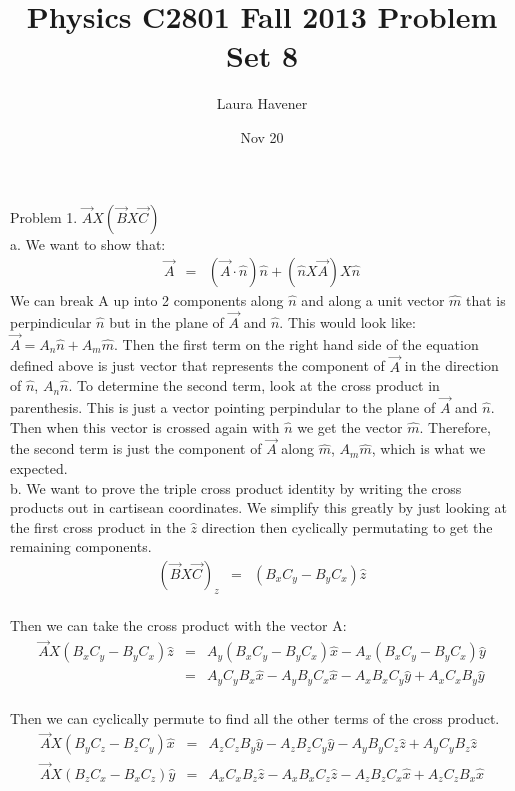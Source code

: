 \documentclass[11pt]{amsart}
\title{Physics C2801 Fall 2013 Problem Set 8}
\author{Laura Havener}
\date{Nov 20} %
\begin{document}
\maketitle

Problem 1. $\vec{A}X(\vec{B}X\vec{C})$ \\ 
a. We want to show that: \\
\begin{eqnarray*}
\vec{A} &=& (\vec{A}\cdot{\hat{n}})\hat{n}+(\hat{n}X\vec{A})X\hat{n} 
\end{eqnarray*} 
We can break A up into 2 components along $\hat{n}$ and along a unit vector $\hat{m}$ that is perpindicular $\hat{n}$ but in the plane of $\vec{A}$ and $\hat{n}$. This would look like: $\vec{A} = A_{n}\hat{n}+A_{m}\hat{m}$. Then the first term on the right hand side of the equation defined above is just vector that represents the component of $\vec{A}$ in the direction of $\hat{n}$, $A_{n}\hat{n}$. To determine the second term, look at the cross product in parenthesis. This is just a vector pointing perpindular to the plane of $\vec{A}$ and $\hat{n}$. Then when this vector is crossed again with $\hat{n}$ we get the vector $\hat{m}$. Therefore, the second term is just the component of $\vec{A}$ along $\hat{m}$, $A_{m}\hat{m}$, which is what we expected. \\
b. We want to prove the triple cross product identity by writing the cross products out in cartisean coordinates. We simplify this greatly by just looking at the first cross product in the $\hat{z}$ direction then cyclically permutating to get the remaining components. \\
\begin{eqnarray*}
(\vec{B}X\vec{C})_{z} &=& (B_{x}C_{y}-B_{y}C_{x})\hat{z} 
\end{eqnarray*} \\
Then we can take the cross product with the vector A: \\
\begin{eqnarray*}
\vec{A}X(B_{x}C_{y}-B_{y}C_{x})\hat{z} &=& A_{y}(B_{x}C_{y}-B_{y}C_{x})\hat{x}-A_{x}(B_{x}C_{y}-B_{y}C_{x})\hat{y} \\
&=& A_{y}C_{y}B_{x}\hat{x}-A_{y}B_{y}C_{x}\hat{x}-A_{x}B_{x}C_{y}\hat{y}+A_{x}C_{x}B_{y}\hat{y} 
\end{eqnarray*} \\
Then we can cyclically permute to find all the other terms of the cross product. \\
\begin{eqnarray*} 
\vec{A}X(B_{y}C_{z}-B_{z}C_{y})\hat{x} &=& A_{z}C_{z}B_{y}\hat{y}-A_{z}B_{z}C_{y}\hat{y}-A_{y}B_{y}C_{z}\hat{z}+A_{y}C_{y}B_{z}\hat{z} \\
\vec{A}X(B_{z}C_{x}-B_{x}C_{z})\hat{y} &=& A_{x}C_{x}B_{z}\hat{z}-A_{x}B_{x}C_{z}\hat{z}-A_{z}B_{z}C_{x}\hat{x}+A_{z}C_{z}B_{x}\hat{x} 
\end{eqnarray*} \\
\end{document}
